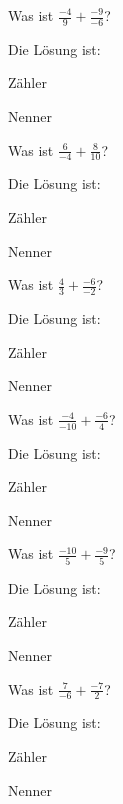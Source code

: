 \documentclass{ximera}
\begin{document}
\begin{shuffle}
\begin{question}
Was ist $\frac{-4}{9} + \frac{-9}{-6}$?
\begin{solution}
Die Lösung ist:

Zähler 

Nenner 
\end{solution}
\end{question}


\begin{question}
Was ist $\frac{6}{-4} + \frac{8}{10}$?
\begin{solution}
Die Lösung ist:

Zähler 

Nenner 
\end{solution}
\end{question}


\begin{question}
Was ist $\frac{4}{3} + \frac{-6}{-2}$?
\begin{solution}
Die Lösung ist:

Zähler 

Nenner 
\end{solution}
\end{question}


\begin{question}
Was ist $\frac{-4}{-10} + \frac{-6}{4}$?
\begin{solution}
Die Lösung ist:

Zähler 

Nenner 
\end{solution}
\end{question}


\begin{question}
Was ist $\frac{-10}{5} + \frac{-9}{5}$?
\begin{solution}
Die Lösung ist:

Zähler 

Nenner 
\end{solution}
\end{question}


\begin{question}
Was ist $\frac{7}{-6} + \frac{-7}{2}$?
\begin{solution}
Die Lösung ist:

Zähler 

Nenner 
\end{solution}
\end{question}



\end{shuffle}
\end{document}
